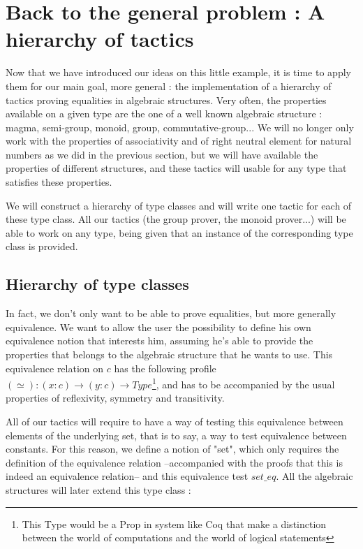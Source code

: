 \section {Back to the general problem : A hierarchy of tactics}

Now that we have introduced our ideas on this little example, it is time to apply them for our main goal, more general : the implementation of a hierarchy of tactics proving equalities in algebraic structures. Very often, the properties available on a given type are the one of a well known algebraic structure : magma, semi-group, monoid, group, commutative-group...  We will no longer only work with the properties of associativity and of right neutral element for natural numbers as we did in the previous section, but we will have available the properties of different structures, and these tactics will usable for any type that satisfies these properties.

We will construct a hierarchy of type classes and will write one tactic for each of these type class. All our tactics (the group prover, the monoid prover...) will be able to work on any type, being given that an instance of the corresponding type class is provided.

\subsection {Hierarchy of type classes}

In fact, we don't only want to be able to prove equalities, but more generally equivalence. We want to allow the user the possibility to define his own equivalence notion that interests him, assuming he's able to provide the properties that belongs to the algebraic structure that he wants to use. This equivalence relation on $c$ has the following profile $(\simeq) : (x:c) \rightarrow (y:c) \rightarrow Type$\footnote{This Type would be a Prop in system like Coq that make a distinction between the world of computations and the world of logical statements}, and has to be accompanied by the usual properties of reflexivity, symmetry and transitivity.

All of our tactics will require to have a way of testing this equivalence between elements of the underlying set, that is to say, a way to test equivalence between constants. For this reason, we define a notion of "set", which only requires the definition of the equivalence relation --accompanied with the proofs that this is indeed an equivalence relation-- and this equivalence test $set\_eq$. All the algebraic structures will later extend this type class :

